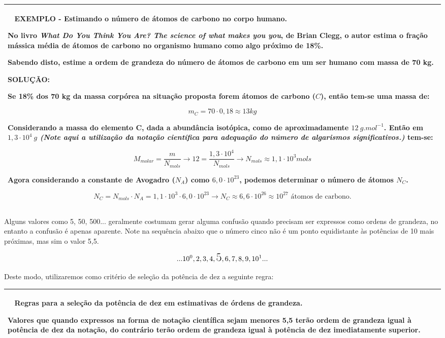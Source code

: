 \documentclass[a4paper, 11pt]{report}
\newenvironment{myboxed}
    {
        \begin{center}
        \begin{tabular}{p{0.7\textwidth}}
        \hline\
    }
    { 
        \\\hline
        \end{tabular} 
        \end{center}
    }
\begin{document}
\begin{myboxed}
    \textbf{EXEMPLO - Estimando o número de átomos de carbono no corpo humano.}

    No livro 
    \emph{What Do You Think You Are? The science of what makes you you}, de 
    Brian Clegg, o autor estima o fração mássica média de átomos de carbono no 
    organismo humano como algo próximo de 18\%. 

    Sabendo disto, estime a ordem de grandeza do número de átomos de carbono 
    em um ser humano com massa de 70 kg.

    \textbf{SOLUÇÃO:}

    Se 18\% dos 70 kg da massa corpórea na situação proposta forem átomos de 
    carbono ($C$), então tem-se uma massa de:
    
    $$
        m_C = 70 \cdot 0,18 \approx 13 kg
    $$

    Considerando a massa do elemento C, dada a abundância isotópica, como de 
    aproximadamente $12 \: g.mol^{-1}$. Então em $1,3 \cdot 10^4 \: g$
    \emph{
        (Note aqui a utilização da notação científica para adequação do número de
        algarismos significativos.)
    }
    tem-se:

    $$ 
        M_{molar} = \frac{m}{N_{mols}} \rightarrow 
        12 = \frac{1,3 \cdot 10^4}{N_{mols}} \rightarrow 
        N_{mols} \approx 1,1 \cdot 10^3 mols
    $$

    Agora considerando a constante de Avogadro ($N_A$) como $6,0 \cdot 10^{23}$, podemos
    determinar o número de átomos $N_C$.

    $$
        N_C = {N_{mols}}\cdot{N_A} = {1,1 \cdot 10^3}\cdot{6,0 \cdot 10^{23}} 
        \rightarrow N_C \approx 6,6 \cdot 10^{26}  \approx 10^{27} 
        \text{ átomos de carbono}.
    $$
 
\end{myboxed}

Alguns valores como 5, 50, 500... geralmente costumam gerar alguma confusão 
quando precisam ser expressos como ordens de grandeza, no entanto a confusão é 
apenas aparente. Note na sequência abaixo que o número cinco não é um ponto 
equidistante às potências de 10 mais próximas, mas sim o  valor 5,5.

$$
    ...10^0, 2, 3, 4, \text{\LARGE 5}, 6, 7, 8, 9, 10^1...
$$

Deste modo, utilizaremos como critério de seleção da potência de dez a seguinte
regra:

\begin{myboxed}
    \textbf{Regras para a seleção da potência de dez em estimativas de órdens
    de grandeza.}

    Valores que quando expressos na forma de notação científica sejam menores
    5,5 terão ordem de grandeza igual à potência de dez da notação, do contrário
    terão ordem de grandeza igual à potência de dez imediatamente superior.
\end{myboxed}


\label{lastpage}
\end{document}
